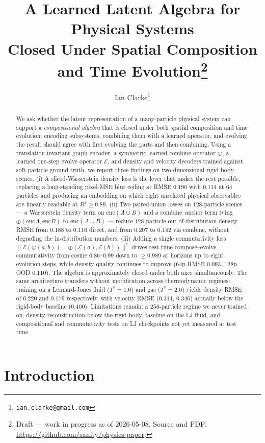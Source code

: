 \documentclass[11pt]{article}
\title{A Learned Latent Algebra for Physical Systems\\ Closed Under Spatial Composition and Time Evolution\thanks{Draft --- work in progress as of 2026-05-08. Source and PDF: \url{https://github.com/sanity/physics-paper}.}}
\author{Ian Clarke\thanks{\texttt{ian.clarke@gmail.com}}}
\affil{Independent}
\date{}
\newcommand{\enc}{\mathrm{enc}}
\newcommand{\combine}{\oplus}
\newcommand{\evolve}{\mathcal{E}}
\begin{document}
\maketitle

\begin{abstract}
We ask whether the latent representation of a many-particle physical system can support a \emph{compositional algebra} that is closed under both spatial composition and time evolution: encoding subsystems, combining them with a learned operator, and evolving the result should agree with first evolving the parts and then combining. Using a translation-invariant graph encoder, a symmetric learned combine operator $\combine$, a learned one-step evolve operator $\evolve$, and density and velocity decoders trained against soft particle ground truth, we report three findings on two-dimensional rigid-body scenes. (i) A sliced-Wasserstein density loss is the lever that makes the rest possible, replacing a long-standing pixel-MSE blur ceiling at RMSE $0.190$ with $0.114$ at $64$ particles and producing an embedding on which eight unrelated physical observables are linearly readable at $R^2 \ge 0.89$. (ii) Two paired-union losses on $128$-particle scenes --- a Wasserstein density term on $\enc(A \cup B)$ and a combine--anchor term tying $\combine(\enc A, \enc B)$ to $\enc(A \cup B)$ --- reduce $128$-particle out-of-distribution density RMSE from $0.188$ to $0.116$ direct, and from $0.207$ to $0.142$ via combine, without degrading the in-distribution numbers. (iii) Adding a single commutativity loss $\|\evolve(\combine(a, b)) - \combine(\evolve(a), \evolve(b))\|^2$ drives test-time compose--evolve commutativity from cosine $0.86$--$0.99$ down to $\ge 0.989$ at horizons up to eight evolution steps, while density quality continues to improve ($64$p RMSE $0.093$, $128$p OOD $0.110$). The algebra is approximately closed under both axes simultaneously. The same architecture transfers without modification across thermodynamic regimes: training on a Lennard-Jones fluid ($T^* = 1.0$) and gas ($T^* = 2.0$) yields density RMSE of $0.220$ and $0.179$ respectively, with velocity RMSE ($0.314$, $0.346$) actually below the rigid-body baseline ($0.400$). Limitations remain: a $256$-particle regime we never trained on, density reconstruction below the rigid-body baseline on the LJ fluid, and compositional and commutativity tests on LJ checkpoints not yet measured at test time.
\end{abstract}

\section{Introduction}
\end{document}
